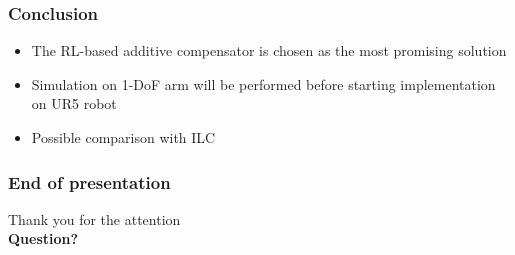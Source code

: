 \documentclass{beamer}
\begin{document}
			\begin{frame}\frametitle{Conclusion}			
			\begin{itemize}
				\item The RL-based additive compensator is chosen as the most promising solution
				\item Simulation on 1-DoF arm will be performed before starting implementation on UR5 robot
				\item Possible comparison with ILC
			\end{itemize}
			\end{frame}		
			\begin{frame}\frametitle{End of presentation}			
					\centering
					Thank you for the attention \\
					\vspace{3mm}
					\fontsize{15}{4}\selectfont\textbf{ Question?}
			\end{frame}					
		
\end{document}
